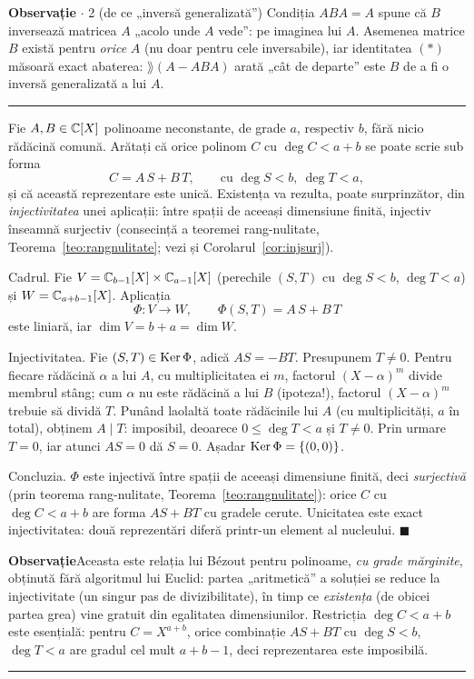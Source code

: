 \medskip
\noindent\textbf{Observație} $\cdot$ 2 (de ce „inversă generalizată'')\quad
Condiția $ABA = A$ spune că $B$ inversează matricea $A$ „acolo unde $A$ vede'': pe imaginea
lui $A$. Asemenea matrice $B$ există pentru \emph{orice} $A$ (nu doar pentru cele inversabile), iar
identitatea $(*)$ măsoară exact abaterea: $\rang(A - ABA)$
arată „cât de departe'' este $B$ de a fi o inversă generalizată a lui $A$.
\vspace{1mm}\hrule

Fie $A, B \in \mathbb{C}[X]$ polinoame neconstante, de grade $a$, respectiv $b$, fără nicio rădăcină comună. Arătați că orice polinom $C$ cu $\deg C < a + b$ se poate scrie sub forma
\[
C = A\,S + B\,T, \qquad \text{cu } \deg S < b,\ \deg T < a,
\]
și că această reprezentare este unică.
\sol Existența va rezulta, poate surprinzător, din \emph{injectivitatea} unei aplicații: între spații de aceeași dimensiune finită, injectiv înseamnă surjectiv (consecință a teoremei rang-nulitate, Teorema~\ref{teo:rangnulitate}; vezi și Corolarul~\ref{cor:injsurj}).

\smallskip
\textup{Cadrul.} Fie $V = \mathbb{C}_{b-1}[X] \times \mathbb{C}_{a-1}[X]$ (perechile $(S,T)$ cu $\deg S < b$, $\deg T < a$) și $W = \mathbb{C}_{a+b-1}[X]$. Aplicația
\[
\Phi : V \to W, \qquad \Phi(S,T) = A\,S + B\,T
\]
este liniară, iar $\dim V = b + a = \dim W$.

\smallskip
\textup{Injectivitatea.} Fie $(S,T) \in \operatorname{Ker} \Phi$, adică $AS = -BT$. Presupunem $T \neq 0$. Pentru fiecare rădăcină $\alpha$ a lui $A$, cu multiplicitatea ei $m$, factorul $(X - \alpha)^m$ divide membrul stâng; cum $\alpha$ nu este rădăcină a lui $B$ (ipoteza!), factorul $(X - \alpha)^m$ trebuie să dividă $T$. Punând laolaltă toate rădăcinile lui $A$ (cu multiplicități, $a$ în total), obținem $A \mid T$: imposibil, deoarece $0 \leq \deg T < a$ și $T \neq 0$. Prin urmare $T = 0$, iar atunci $AS = 0$ dă $S = 0$. Așadar $\operatorname{Ker} \Phi = \{(0,0)\}$.

\smallskip
\textup{Concluzia.} $\Phi$ este injectivă între spații de aceeași dimensiune finită, deci \emph{surjectivă} (prin teorema rang-nulitate, Teorema~\ref{teo:rangnulitate}): orice $C$ cu $\deg C < a + b$ are forma $AS + BT$ cu gradele cerute. Unicitatea este exact injectivitatea: două reprezentări diferă printr-un element al nucleului. $\blacksquare$

\medskip
\noindent\textup{\textbf{Observație}}\quad \textup{Aceasta este relația lui B\'ezout pentru polinoame, \emph{cu grade mărginite}, obținută fără algoritmul lui Euclid: partea „aritmetică'' a soluției se reduce la injectivitate (un singur pas de divizibilitate), în timp ce \emph{existența} (de obicei partea grea) vine gratuit din egalitatea dimensiunilor. Restricția $\deg C < a + b$ este esențială: pentru $C = X^{a+b}$, orice combinație $AS + BT$ cu $\deg S < b$, $\deg T < a$ are gradul cel mult $a + b - 1$, deci reprezentarea este imposibilă.}
\vspace{1mm}\hrule

